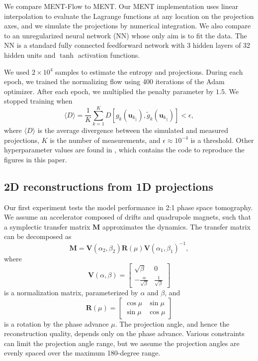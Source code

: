\documentclass[%
    reprint,
    twocolumn,
    nofootinbib,
    amsmath,
    amssymb,
    aps,
    prstab,
]{revtex4-2}
\newcommand{\vect}[1]{\boldsymbol{\mathbf{#1}}}
\begin{document}
We compare MENT-Flow to MENT. Our MENT implementation uses linear interpolation to evaluate the Lagrange functions at any location on the projection axes, and we simulate the projections by numerical integration. We also compare to an unregularized neural network (NN) whose only aim is to fit the data. The NN is a standard fully connected feedforward network with 3 hidden layers of 32 hidden units and $\tanh$ activation functions. 

We used $2 \times 10^4$ samples to estimate the entropy and projections. During each epoch, we trained the normalizing flow using 400 iterations of the Adam optimizer. After each epoch, we multiplied the penalty parameter by $1.5$. We stopped training when
%
\begin{equation}\label{eq:stop}
    \langle D \rangle = 
    \frac{1}{K}
    \sum_{k=1}^{K} {
        D[
            {g}_k(\vect{u}_{k_\parallel}), 
            \tilde{g}_k(\vect{u}_{k_\parallel})
        ]
    }
    < \epsilon,
\end{equation}
%
where $\langle D \rangle$ is the average divergence between the simulated and measured projections, $K$ is the number of measurements, and $\epsilon \approx 10^{-4}$ is a threshold. Other hyperparameter values are found in \cite{Hoover_2024_zenodo}, which contains the code to reproduce the figures in this paper.


\subsection{2D reconstructions from 1D projections}

Our first experiment tests the model performance in 2:1 phase space tomography. We assume an accelerator composed of drifts and quadrupole magnets, such that a symplectic transfer matrix $\vect{M}$ approximates the dynamics. The transfer matrix can be decomposed as
%
\begin{equation}\label{eq:floquet}
    \vect{M} = \vect{V}(\alpha_2, \beta_2) \vect{R}(\mu) \vect{V}(\alpha_1, \beta_1)^{-1},
\end{equation}
%
where 
%
\begin{equation}\label{eq:vmat}
    \vect{V}(\alpha, \beta) = 
    \begin{bmatrix}
        \sqrt{\beta} & 0 \\ -\frac{\alpha}{\sqrt{\beta}} & \frac{1}{\sqrt{\beta}}
    \end{bmatrix}
\end{equation}
%
is a normalization matrix, parameterized by $\alpha$ and $\beta$, and  
%
\begin{equation}\label{eq:rmat}
    \vect{R}(\mu) = \begin{bmatrix}
        \cos\mu & \sin\mu \\   \sin\mu & \cos\mu 
    \end{bmatrix}
\end{equation}
%
is a rotation by the phase advance $\mu$. The projection angle, and hence the reconstruction quality, depends only on the phase advance. Various constraints can limit the projection angle range, but we assume the projection angles are evenly spaced over the maximum 180-degree range. 
\end{document}
